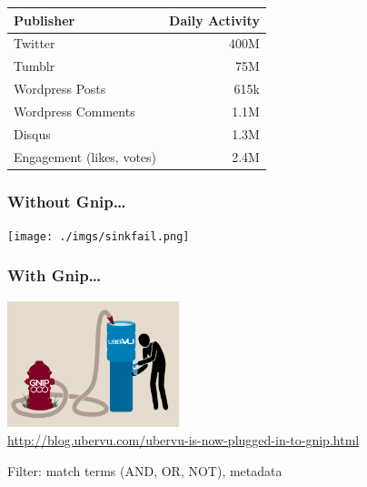 \documentclass{beamer}
\begin{document}
\begin{frame} 
\begin{table}
\begin{tabular}{l|r}
\hline
   {Publisher}   &   {Daily Activity}   \\
\hline 
    Twitter      &      400M   \\
    Tumblr      &        75M   \\
    Wordpress Posts &     615k   \\
    Wordpress Comments & 1.1M \\
    Disqus       &       1.3M  \\
    Engagement (likes, votes) & 2.4M  \\
\hline
\end{tabular}
\end{table}
\end{frame}


\begin{frame}\frametitle{Without Gnip\ldots}
  \begin{center}
    \texttt{[image: ./imgs/sinkfail.png]}
  \end{center}
\end{frame}


\begin{frame}\frametitle{With Gnip\ldots}
  \begin{center}
    \includegraphics[width=5cm]{./imgs/GNIP-firehose-office-drinking-fountain_FINAL.jpeg} \\ [6pt]
    \url{http://blog.ubervu.com/ubervu-is-now-plugged-in-to-gnip.html}
  \end{center}
\end{frame}




\begin{frame}
\begin{center}
{\Huge Filter: match terms (AND, OR, NOT), metadata }
\end{center}
\end{frame}
\end{document}

